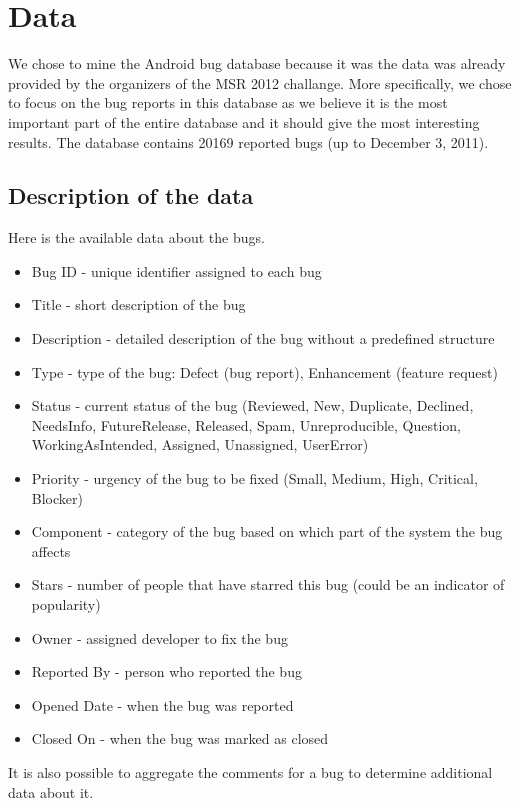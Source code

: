 \section{Data} %
\label{sub:Data}
We chose to mine the Android bug database because it was the data was already provided by the organizers of the MSR 2012 challange. More specifically, we chose to focus on the bug reports in this database as we believe it is the most important part of the entire database and it should give the most interesting results. The database contains 20169 reported bugs (up to December 3, 2011). 

\subsection*{Description of the data} %
\label{sub:Description of the data}

Here is the available data about the bugs.

\begin{itemize}
\item Bug ID - unique identifier assigned to each bug
\item Title - short description of the bug
\item Description - detailed description of the bug without a predefined structure
\item Type - type of the bug: Defect (bug report), Enhancement (feature request)
\item Status - current status of the bug (Reviewed, New, Duplicate, Declined, NeedsInfo, FutureRelease, Released, Spam, Unreproducible, Question, WorkingAsIntended, Assigned, Unassigned, UserError)
\item Priority - urgency of the bug to be fixed (Small, Medium, High, Critical, Blocker)
\item Component - category of the bug based on which part of the system the bug affects
\item Stars - number of people that have starred this bug (could be an indicator of popularity)
\item Owner - assigned developer to fix  the bug
\item Reported By - person who reported the bug
\item Opened Date - when the bug was reported
\item Closed On - when the bug was marked as closed
\end{itemize}

It is also possible to aggregate the comments for a bug to determine additional data about it.

